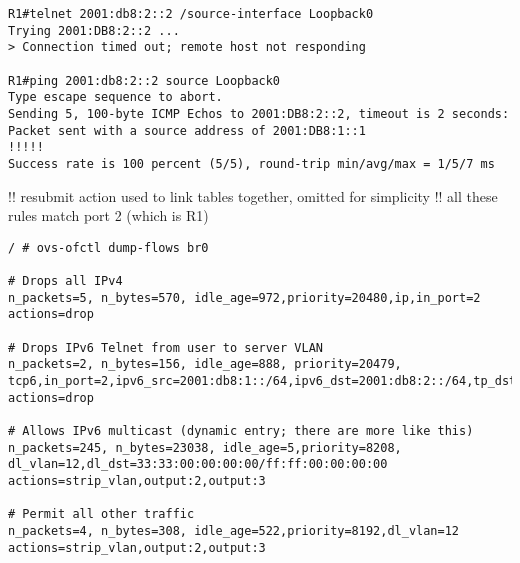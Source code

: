 \begin{verbatim}
R1#telnet 2001:db8:2::2 /source-interface Loopback0
Trying 2001:DB8:2::2 ...
> Connection timed out; remote host not responding

R1#ping 2001:db8:2::2 source Loopback0
Type escape sequence to abort.
Sending 5, 100-byte ICMP Echos to 2001:DB8:2::2, timeout is 2 seconds:
Packet sent with a source address of 2001:DB8:1::1
!!!!!
Success rate is 100 percent (5/5), round-trip min/avg/max = 1/5/7 ms
\end{verbatim}

!! resubmit action used to link tables together, omitted for simplicity
!! all these rules match port 2 (which is R1)

\begin{verbatim}
/ # ovs-ofctl dump-flows br0

# Drops all IPv4
n_packets=5, n_bytes=570, idle_age=972,priority=20480,ip,in_port=2
actions=drop

# Drops IPv6 Telnet from user to server VLAN
n_packets=2, n_bytes=156, idle_age=888, priority=20479,
tcp6,in_port=2,ipv6_src=2001:db8:1::/64,ipv6_dst=2001:db8:2::/64,tp_dst=23
actions=drop

# Allows IPv6 multicast (dynamic entry; there are more like this)
n_packets=245, n_bytes=23038, idle_age=5,priority=8208,
dl_vlan=12,dl_dst=33:33:00:00:00:00/ff:ff:00:00:00:00
actions=strip_vlan,output:2,output:3

# Permit all other traffic
n_packets=4, n_bytes=308, idle_age=522,priority=8192,dl_vlan=12
actions=strip_vlan,output:2,output:3
\end{verbatim}

